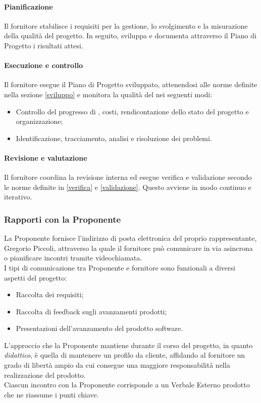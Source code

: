 \paragraph{Pianificazione}
Il fornitore stabilisce i requisiti per la gestione, lo svolgimento e la misurazione della qualità del progetto. In seguito, sviluppa e documenta attraverso il Piano di Progetto i risultati attesi.

\paragraph{Esecuzione e controllo}
Il fornitore esegue il Piano di Progetto sviluppato, attenendosi alle norme definite nella sezione \ref{sviluppo} e monitora la qualità del  nei seguenti modi:
\begin{itemize}
  \item Controllo del progresso di , costi, rendicontazione dello stato del progetto e organizzazione;
  \item Identificazione, tracciamento, analisi e risoluzione dei problemi.
\end{itemize}

\paragraph{Revisione e valutazione}
Il fornitore coordina la revisione interna ed esegue verifica e validazione secondo le norme definite in \ref{verifica} e \ref{validazione}. Questo avviene in modo continuo e iterativo.

\subsubsection{Rapporti con la Proponente} La Proponente \Proponente{} fornisce l'indirizzo di posta elettronica del proprio rappresentante, Gregorio Piccoli, attraverso la quale il fornitore può comunicare in via asincrona o pianificare incontri tramite videochiamata.\\
I tipi di comunicazione tra Proponente e fornitore sono funzionali a diversi aspetti del progetto:
\begin{itemize}
  \item Raccolta dei requisiti;
  \item Raccolta di feedback sugli avanzamenti prodotti;
  \item Presentazioni dell'avanzamento del prodotto software.
\end{itemize}
L'approccio che la Proponente mantiene durante il corso del progetto, in quanto \textit{didattico}, è quella di mantenere un profilo da cliente, affidando al fornitore un grado di libertà ampio da cui consegue una maggiore responsabilità nella realizzazione del prodotto.\\
Ciascun incontro con la Proponente corrisponde a un Verbale Esterno prodotto che ne riassume i punti chiave.


